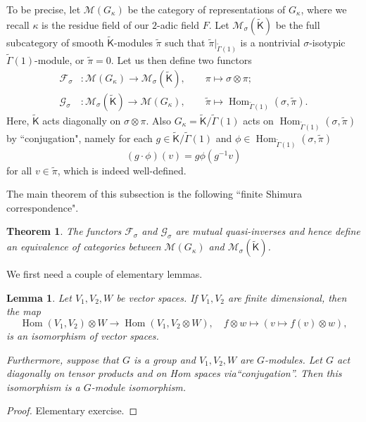 \documentclass[10pt, letterpaper]{amsart}
\theoremstyle{plain}
\newtheorem{Thm}[equation]{Theorem}
\newtheorem{Lem}[equation]{Lemma}
\theoremstyle{definition}
\numberwithin{equation}{section}
\newcommand{\pit}{\tilde{\pi}}
\newcommand{\Hom}{\operatorname{Hom}}
\newcommand{\Kf}{\mathsf{K}}
\newcommand{\Gammaf}{\mathsf{\Gamma}}
\begin{document}
To be precise, let $\mathcal{M}(G_\kappa)$ be the category of representations of $G_\kappa$, where we recall $\kappa$ is the residue field of our $2$-adic field $F$. Let $\mathcal{M}_{\sigma}(\widetilde{{\Kf}})$ be the full subcategory of smooth $\widetilde{{\Kf}}$-modules $\widetilde{\pi}$ such that $\widetilde{\pi}|_{\widetilde{\Gammaf}(1)}$ is a nontrivial $\sigma$-isotypic $\widetilde{\Gammaf}(1)$-module, or $\pit=0$. Let us then define two functors
\begin{align*}
\mathcal{F}_{\sigma}&:\mathcal{M}(G_{\kappa})\rightarrow \mathcal{M}_{\sigma}(\widetilde{{\Kf}}),\qquad \pi\mapsto \sigma\otimes \pi;\\
\mathcal{G}_{\sigma}&:\mathcal{M}_{\sigma}(\widetilde{{\Kf}})\rightarrow \mathcal{M}(G_{\kappa}),\qquad \widetilde{\pi}\mapsto \Hom_{\widetilde{\Gammaf}(1)}(\sigma,\widetilde{\pi}).
\end{align*}
Here, $\widetilde{{\Kf}}$ acts diagonally on $\sigma\otimes \pi$. Also $G_\kappa=\widetilde{\Kf}\slash\widetilde{\Gammaf}(1)$ acts on $\Hom_{\widetilde{\Gammaf}(1)}(\sigma,\widetilde{\pi})$ by ``conjugation", namely for each $g\in \widetilde{\Kf}\slash\widetilde{\Gammaf}(1)$ and $\phi\in \Hom_{\widetilde{\Gammaf}(1)}(\sigma,\widetilde{\pi})$
\[
(g\cdot \phi)(v)=g\phi(g^{-1}v)
\] 
for all $v\in \widetilde{\pi}$, which is indeed well-defined.

The main theorem of this subsection is the following ``finite Shimura correspondence".

\begin{Thm}\label{FiniteShimCor}
	The functors $\mathcal{F}_{\sigma}$ and $\mathcal{G}_{\sigma}$ are mutual quasi-inverses and hence define an equivalence of categories between $\mathcal{M}(G_{\kappa})$ and $\mathcal{M}_{\sigma}(\widetilde{{\Kf}})$.
\end{Thm}

We first need a couple of elementary lemmas.

\begin{Lem}\label{FinRkLem}
	Let $V_{1},V_{2},W$ be vector spaces. If $V_{1},V_{2}$ are finite dimensional, then the map 
    \[
    \Hom(V_{1},V_{2})\otimes W\rightarrow \Hom(V_{1},V_{2}\otimes W),\quad f\otimes w\mapsto (v\mapsto f(v)\otimes w),
    \]
    is an isomorphism of vector spaces. 
	
	Furthermore, suppose that $G$ is a group and $V_{1},V_{2},W$ are $G$-modules. Let $G$ act diagonally on tensor products and on Hom spaces via``conjugation''. Then this isomorphism is a $G$-module isomorphism. 
\end{Lem}	
\begin{proof}
Elementary exercise.
\end{proof}
\end{document}
